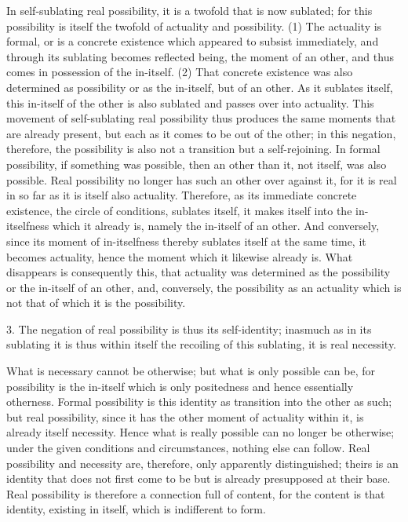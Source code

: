 In self-sublating real possibility,
it is a twofold that is now sublated;
for this possibility is itself
the twofold of actuality and possibility.
(1) The actuality is formal, or is a concrete existence
which appeared to subsist immediately,
and through its sublating becomes reflected being,
the moment of an other,
and thus comes in possession of the in-itself.
(2) That concrete existence was also determined
as possibility or as the in-itself, but of an other.
As it sublates itself, this in-itself of the other is
also sublated and passes over into actuality.
This movement of self-sublating real possibility
thus produces the same moments that are already present,
but each as it comes to be out of the other;
in this negation, therefore, the possibility
is also not a transition but a self-rejoining.
In formal possibility, if something was possible,
then an other than it, not itself, was also possible.
Real possibility no longer has such an other over against it,
for it is real in so far as it is itself also actuality.
Therefore, as its immediate concrete existence,
the circle of conditions, sublates itself,
it makes itself into the in-itselfness which it already is,
namely the in-itself of an other.
And conversely, since its moment of in-itselfness
thereby sublates itself at the same time,
it becomes actuality, hence the moment
which it likewise already is.
What disappears is consequently this,
that actuality was determined as the possibility
or the in-itself of an other,
and, conversely, the possibility as an actuality
which is not that of which it is the possibility.

3. The negation of real possibility is thus its self-identity;
inasmuch as in its sublating it is thus within itself
the recoiling of this sublating, it is real necessity.

What is necessary cannot be otherwise;
but what is only possible can be,
for possibility is the in-itself
which is only positedness
and hence essentially otherness.
Formal possibility is this identity
as transition into the other as such;
but real possibility, since it has
the other moment of actuality within it,
is already itself necessity.
Hence what is really possible can no longer be otherwise;
under the given conditions and circumstances,
nothing else can follow.
Real possibility and necessity are, therefore,
only apparently distinguished;
theirs is an identity that does not first come to be
but is already presupposed at their base.
Real possibility is therefore a connection full of content,
for the content is that identity, existing in itself,
which is indifferent to form.

